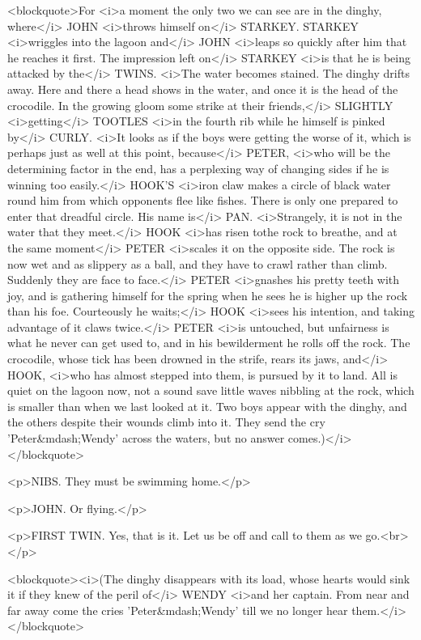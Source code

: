 <blockquote>For <i>a moment the only two we can see are in the
dinghy, where</i> JOHN <i>throws himself on</i> STARKEY. STARKEY
<i>wriggles into the lagoon and</i> JOHN <i>leaps so quickly after
him that he reaches it first. The impression left on</i> STARKEY
<i>is that he is being attacked by the</i> TWINS. <i>The water
becomes stained. The dinghy drifts away. Here and there a head shows
in the water, and once it is the head of the crocodile. In the
growing gloom some strike at their friends,</i> SLIGHTLY
<i>getting</i> TOOTLES <i>in the fourth rib while he himself is
pinked by</i> CURLY. <i>It looks as if the boys were getting the
worse of it, which is perhaps just as well at this point, because</i>
PETER, <i>who will be the determining factor in the end, has a
perplexing way of changing sides if he is winning too easily.</i>
HOOK'S <i>iron claw makes a circle of black water round him from
which opponents flee like fishes. There is only one prepared to enter
that dreadful circle. His name is</i> PAN. <i>Strangely, it is not in
the water that they meet.</i> HOOK <i>has risen tothe rock to
breathe, and at the same moment</i> PETER <i>scales it on the
opposite side. The rock is now wet and as slippery as a ball, and
they have to crawl rather than climb. Suddenly they are face to
face.</i> PETER <i>gnashes his pretty teeth with joy, and is
gathering himself for the spring when he sees he is higher up the
rock than his foe. Courteously he waits;</i> HOOK <i>sees his
intention, and taking advantage of it claws twice.</i> PETER <i>is
untouched, but unfairness is what he never can get used to, and in
his bewilderment he rolls off the rock. The crocodile, whose tick has
been drowned in the strife, rears its jaws, and</i> HOOK, <i>who has
almost stepped into them, is pursued by it to land. All is quiet on
the lagoon now, not a sound save little waves nibbling at the rock,
which is smaller than when we last looked at it. Two boys appear with
the dinghy, and the others despite their wounds climb into it. They
send the cry 'Peter&mdash;Wendy' across the waters, but no answer
comes.)</i></blockquote>

<p>NIBS. They must be swimming home.</p>

<p>JOHN. Or flying.</p>

<p>FIRST TWIN. Yes, that is it. Let us be off and call to them as we
go.<br>
</p>

<blockquote><i>(The dinghy disappears with its load, whose hearts
would sink it if they knew of the peril of</i> WENDY <i>and her
captain. From near and far away come the cries 'Peter&mdash;Wendy'
till we no longer hear them.</i></blockquote>

